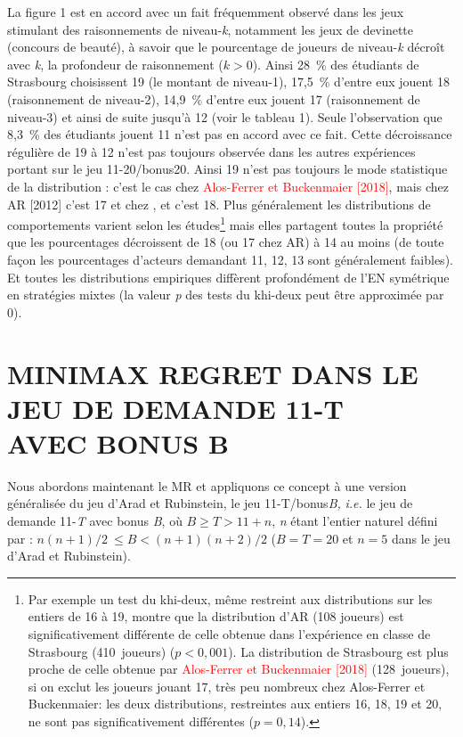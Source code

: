 \begin{Article}
\begin{refsection}[UmbhauerFR]
La figure 1 est en accord avec un fait fréquemment observé dans les jeux
stimulant des raisonnements de niveau-\emph{k}, notamment les jeux de
devinette (concours de beauté), à savoir que le pourcentage de joueurs
de niveau-\emph{k} décroît avec \emph{k}, la profondeur de raisonnement
(\(k > 0\)). Ainsi 28~\% des étudiants de Strasbourg choisissent 19 (le
montant de niveau-1), 17,5~\% d'entre eux jouent 18 (raisonnement de
niveau-2), 14,9~\% d'entre eux jouent 17 (raisonnement de niveau-3) et
ainsi de suite jusqu'à 12 (voir le tableau 1). Seule l'observation que 8,3~\%
des étudiants jouent 11 n'est pas en accord avec ce fait. Cette
décroissance régulière de 19 à 12 n'est pas toujours observée dans les
autres expériences portant sur le jeu 11-20/bonus20. Ainsi 19 n'est pas
toujours le mode statistique de la distribution : c'est le cas chez \textcolor{red}{Alos-Ferrer et Buckenmaier [2018]}, mais chez AR [2012] c'est 17 et chez \textcite{lindner2013}, \textcite{goeree2018} et \textcite{li2018} c'est 18.
Plus généralement les distributions de comportements varient selon les
études\footnote{Par exemple un test du khi-deux, même restreint aux
  distributions sur les entiers de 16 à 19, montre que la distribution
  d'AR (108 joueurs) est significativement différente de celle obtenue
  dans l'expérience en classe de Strasbourg (410~joueurs) ($p<0,001$). La distribution de Strasbourg est plus proche de celle
  obtenue par \textcolor{red}{Alos-Ferrer et
  Buckenmaier [2018]} (128~joueurs), si on
  exclut les joueurs jouant 17, très peu nombreux chez Alos-Ferrer et
  Buckenmaier: les deux distributions, restreintes aux entiers 16, 18,
  19 et 20, ne sont pas significativement différentes ($p=0,14$).}
mais elles partagent toutes la propriété que les pourcentages
décroissent de 18 (ou 17 chez AR) à 14 au moins (de toute façon les
pourcentages d'acteurs demandant 11, 12, 13 sont généralement faibles).
Et toutes les distributions empiriques diffèrent profondément de l'EN
symétrique en stratégies mixtes (la valeur \emph{p} des tests du
khi-deux peut être approximée par 0).

\section{MINIMAX REGRET DANS LE JEU DE DEMANDE 11-T\\ AVEC BONUS B}
\label{section:Minimax Reg dans le jeu}

Nous abordons maintenant le MR et appliquons ce concept à une version
généralisée du jeu d'Arad et Rubinstein, le jeu 11-T/bonus\emph{B,} \emph{i.e.}
le jeu de demande 11-\emph{T} avec bonus \emph{B}, où
\(B \geq T > 11 + n\), \emph{n} étant l'entier naturel défini par :
\(n(n + 1)/2\  \leq B < (n + 1)(n + 2)/2\) (\(B = T = 20\) et \(n = 5\)
dans le jeu d'Arad et Rubinstein).


\end{refsection}
\end{Article}

